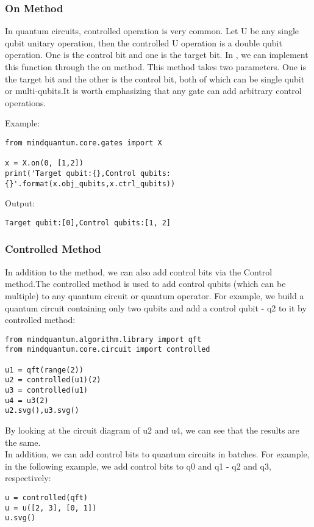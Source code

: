 \subsubsection{On Method}
In quantum circuits, controlled operation is very common. Let U be any single qubit unitary operation, then the controlled U operation is a double qubit operation. One is the control bit and one is the target bit. In \MindQuantum, we can implement this function through the on method. This method takes two parameters. One is the target bit and the other is the control bit, both of which can be single qubit or multi-qubits.It is worth emphasizing that any gate can add arbitrary control operations.

Example:
\begin{lstlisting}
from mindquantum.core.gates import X

x = X.on(0, [1,2])
print('Target qubit:{},Control qubits:{}'.format(x.obj_qubits,x.ctrl_qubits))
\end{lstlisting}
Output:
\begin{lstlisting}
Target qubit:[0],Control qubits:[1, 2]
\end{lstlisting}

\subsubsection{Controlled Method}
In addition to the  method, we can also add control bits via the Control method.The controlled method is used to add control qubits (which can be multiple) to any quantum circuit or quantum operator. For example, we build a quantum circuit containing only two qubits and add a control qubit - q2 to it by controlled method:
\begin{lstlisting}
from mindquantum.algorithm.library import qft
from mindquantum.core.circuit import controlled

u1 = qft(range(2))
u2 = controlled(u1)(2)
u3 = controlled(u1)
u4 = u3(2)
u2.svg(),u3.svg()
\end{lstlisting}
By looking at the circuit diagram of u2 and u4, we can see that the results are the same.\\
In addition, we can add control bits to quantum circuits in batches. For example, in the following example, we add control bits to q0 and q1 - q2 and q3, respectively:
\begin{lstlisting}
u = controlled(qft)
u = u([2, 3], [0, 1])
u.svg()
\end{lstlisting}

% 

